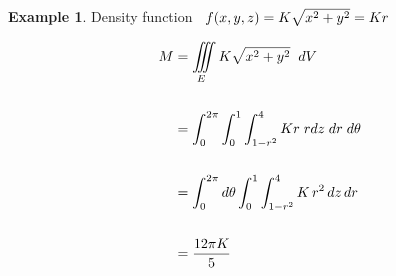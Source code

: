 \documentclass[11pt,a4paper]{article}
\theoremstyle{definition}
\newtheorem{exa}[thm]{Example}
\begin{document}
\begin{exa}
Density function $\hspace{0.2cm}f(x,y,z) = K\sqrt{x^2 + y^2} = K r$


\begin{align*}
M & = \iiint\limits_EK\sqrt{x^2 + y^2}\hspace{0.2cm} dV\\\\
& = \int^{2\pi}_0 \int^1_0 \int^4_{1-r^2} K r\hspace{0.1cm}rdz\hspace{0.1cm} dr \hspace{0.1cm} d\theta\\\\
& = \int^{2\pi}_0 d\theta \int^1_0 \int^4_{1-r^2}K\,r^2\,dz\, dr\\\\
& = \frac{12\pi K}{5}\\
\end{align*}

\pagebreak
\end{exa}
\end{document}
